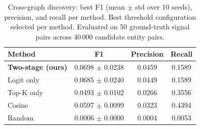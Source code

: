 \begin{table}[t]
\centering
\caption{Cross-graph discovery: best F1 (mean $\pm$ std over 10 seeds), precision, and recall per method. Best threshold configuration selected per method. Evaluated on 50 ground-truth signal pairs across 40\,000 candidate entity pairs.}
\label{tab:exp2}
\begin{tabular}{lccc}
\toprule
Method & F1 & Precision & Recall \\
\midrule
\textbf{Two-stage (ours)} & 0.0698 $\pm$ 0.0238 & 0.0459 & 0.1589 \\
Logit only & 0.0685 $\pm$ 0.0240 & 0.0449 & 0.1589 \\
Top-K only & 0.0493 $\pm$ 0.0102 & 0.0266 & 0.3556 \\
Cosine & 0.0597 $\pm$ 0.0099 & 0.0323 & 0.4394 \\
\midrule
Random & 0.0006 $\pm$ 0.0000 & 0.0004 & 0.0053 \\
\bottomrule
\end{tabular}
\end{table}
